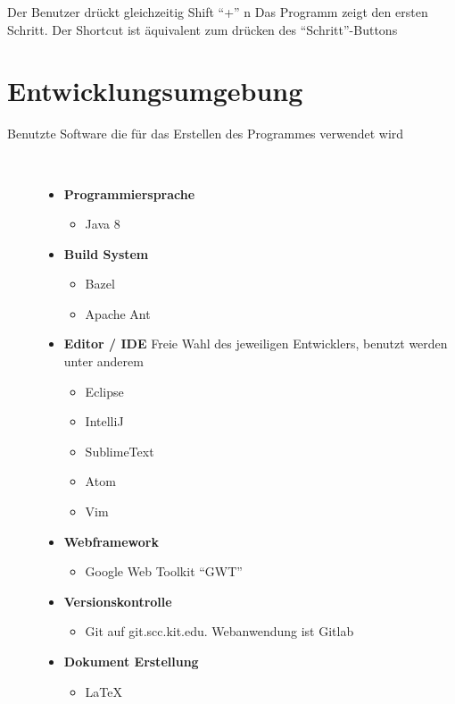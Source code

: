\documentclass[parskip=full,11pt,twoside]{scrartcl}
\begin{document}
{Der Benutzer drückt gleichzeitig Shift \enquote {+} n }
{Das Programm zeigt den ersten Schritt. Der Shortcut ist äquivalent zum drücken des \enquote{Schritt}-Buttons}

\newpage
\section{Entwicklungsumgebung}
  \begin{description}
	\item[Benutzte Software die für das Erstellen des Programmes verwendet wird]~\par
	\begin{itemize}
		\item \textbf{Programmiersprache}
		\begin{itemize}
			\item Java 8
		\end{itemize}
		\item \textbf{Build System}
		\begin{itemize}
			\item Bazel
			\item Apache Ant
		\end{itemize}
		\item \textbf{Editor / IDE}
		\newline Freie Wahl des jeweiligen Entwicklers, benutzt werden unter anderem
		\begin{itemize}
			\item Eclipse
			\item IntelliJ
			\item SublimeText
			\item Atom
			\item Vim
		\end{itemize}
		\item \textbf{Webframework}
		\begin{itemize}
			\item Google Web Toolkit \enquote{GWT}
		\end{itemize}
		\item \textbf{Versionskontrolle}
		\begin{itemize}
			\item Git auf git.scc.kit.edu. Webanwendung ist Gitlab
		\end{itemize}
		\item \textbf{Dokument Erstellung}
		\begin{itemize}
			\item LaTeX

\end{itemize}
\end{itemize}
\end{description}
\end{document}

